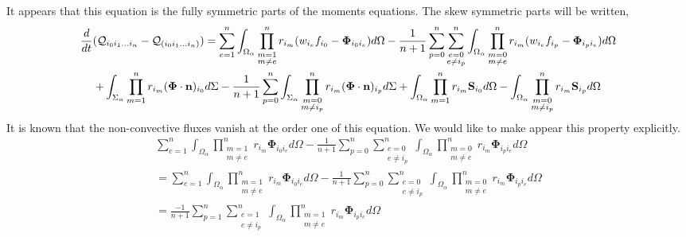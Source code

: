 It appears that this equation is the fully symmetric parts of the moments equations. 
The skew symmetric parts will be written, 
\begin{multline}
    \frac{d}{d t} (
    \mathcal{Q}_{i_0 i_1\ldots i_n} 
    - \mathcal{Q}_{(i_0 i_1\ldots i_n) }
    )
    = 
    \sum_{e=1}^{n} \int_{\Omega_\alpha} \prod^{n}_{\substack{ m=1 \\   m \neq e}} r_{i_m} (w_{i_e}f_{i_0}  - \mathbf{\Phi}_{i_0 i_e})d\Omega
    -
    \frac{1}{n+1}
    \sum_{p=0}^{n}
    \sum_{\substack{ e=0 \\   e \neq i_p}}^{n} \int_{\Omega_\alpha} 
    \prod^{n}_{\substack{ m=0 \\   m \neq e}} r_{i_m} (w_{i_e}f_{i_p}  - \mathbf{\Phi}_{i_p i_e})d\Omega\\
    +\int_{\Sigma_\alpha} \prod_{m=1}^{n} r_{i_m} (\mathbf{\Phi} \cdot \textbf{n})_{i_0}d\Sigma
    -
    \frac{1}{n+1}
    \sum_{p=0}^{n}
    \int_{\Sigma_\alpha} \prod^{n}_{\substack{ m=0 \\   m \neq i_p}} r_{i_m}
    (\mathbf{\Phi} \cdot \textbf{n})_{i_p}d\Sigma
    + \int_{\Omega_\alpha} \prod_{m=1}^{n} r_{i_m} \textbf{S}_{i_0} d\Omega
    -
    \int_{\Omega_\alpha} 
    \prod^{n}_{\substack{ m=0 \\   m \neq i_p}} r_{i_m}
    \textbf{S}_{i_p} d\Omega
\end{multline}
It is known that the non-convective fluxes vanish at the order one of this equation. 
We would like to make appear this property explicitly. 
\begin{multline*}
    \sum_{e=1}^{n} \int_{\Omega_\alpha} \prod^{n}_{\substack{ m=1 \\   m \neq e}} r_{i_m} \mathbf{\Phi}_{i_0 i_e} d\Omega
    -
    \frac{1}{n+1}
    \sum_{p=0}^{n}
    \sum_{\substack{ e=0 \\   e \neq i_p}}^{n} \int_{\Omega_\alpha} 
    \prod^{n}_{\substack{ m=0 \\   m \neq e}} r_{i_m}  \mathbf{\Phi}_{i_p i_e}d\Omega\\
    =
    \sum_{e=1}^{n} \int_{\Omega_\alpha} \prod^{n}_{\substack{ m=1 \\   m \neq e}} r_{i_m} \mathbf{\Phi}_{i_0 i_e}d\Omega
    -
    \frac{1}{n+1}
    \sum_{p=0}^{n}
    \sum_{\substack{ e=0 \\   e \neq i_p}}^{n} \int_{\Omega_\alpha} 
    \prod^{n}_{\substack{ m=0 \\   m \neq e}} r_{i_m}  \mathbf{\Phi}_{i_p i_e}d\Omega\\
    =
    \frac{- 1}{n+1}
    \sum_{p=1}^{n}
    \sum_{\substack{ e=1 \\   e \neq i_p}}^{n} \int_{\Omega_\alpha} 
    \prod^{n}_{\substack{ m=1 \\   m \neq e}} r_{i_m}  \mathbf{\Phi}_{i_p i_e}d\Omega
\end{multline*}
